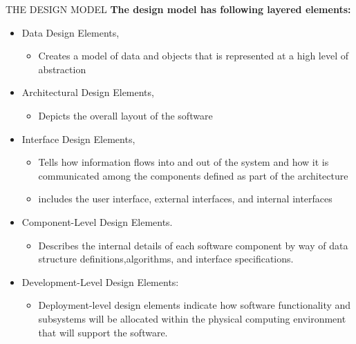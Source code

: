 \documentclass{beamer}
\begin{document}
\begin{frame}{THE DESIGN MODEL}
	\textbf{The design model has following layered elements:}
	\begin{itemize}
		\item 	Data Design Elements,
		\begin{itemize}
			\item Creates a model of data and objects that is represented at a high level of abstraction
		\end{itemize}
		\item Architectural Design Elements,
		\begin{itemize}
			\item Depicts the overall layout of the software
		\end{itemize}
		\item Interface Design Elements, 
		\begin{itemize}
			\item Tells how information flows into and out of the system and how it is communicated among the components defined as part of the architecture
			\item includes the user interface, external interfaces, and internal interfaces
		\end{itemize}
		\item Component-Level Design Elements.
		\begin{itemize}
			\item Describes the internal details of each software component by way of data structure definitions,algorithms, and interface specifications.
		\end{itemize}
	\item Development-Level Design Elements:
	\begin{itemize}
		\item Deployment-level design elements indicate how software functionality and  subsystems will be allocated within the physical computing environment  that will support the software.
		
	\end{itemize}
	\end{itemize}
\end{frame}
\end{document}
